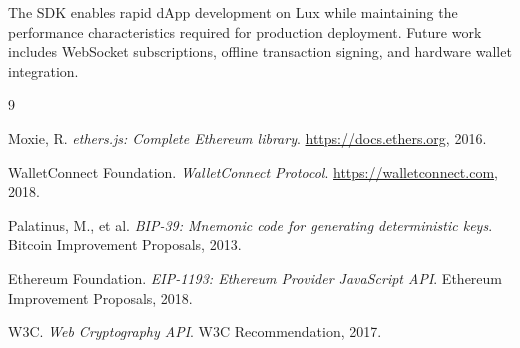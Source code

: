 \documentclass[11pt,twocolumn]{article}
\begin{document}
The SDK enables rapid dApp development on Lux while maintaining the performance characteristics required for production deployment. Future work includes WebSocket subscriptions, offline transaction signing, and hardware wallet integration.

\begin{thebibliography}{9}

Moxie, R.
\textit{ethers.js: Complete Ethereum library}.
\url{https://docs.ethers.org}, 2016.

WalletConnect Foundation.
\textit{WalletConnect Protocol}.
\url{https://walletconnect.com}, 2018.

Palatinus, M., et al.
\textit{BIP-39: Mnemonic code for generating deterministic keys}.
Bitcoin Improvement Proposals, 2013.

Ethereum Foundation.
\textit{EIP-1193: Ethereum Provider JavaScript API}.
Ethereum Improvement Proposals, 2018.

W3C.
\textit{Web Cryptography API}.
W3C Recommendation, 2017.

\end{thebibliography}
\end{document}
